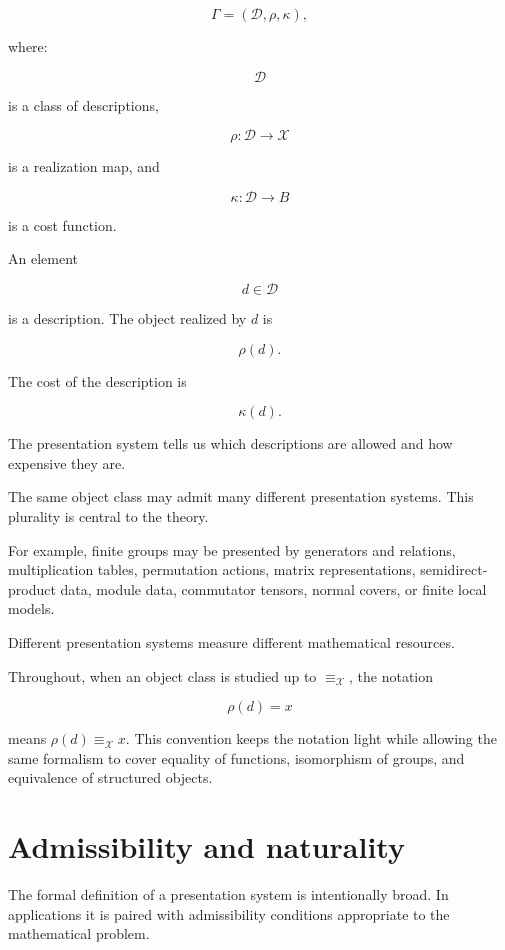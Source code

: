 \documentclass[11pt]{article}
\begin{document}
\[
\Gamma=(\mathcal D,\rho,\kappa),
\]

where:

\[
\mathcal D
\]

is a class of descriptions,

\[
\rho:\mathcal D\to \mathcal X
\]

is a realization map, and

\[
\kappa:\mathcal D\to B
\]

is a cost function.

An element

\[
d\in\mathcal D
\]

is a description. The object realized by \(d\) is

\[
\rho(d).
\]

The cost of the description is

\[
\kappa(d).
\]

The presentation system tells us which descriptions are allowed and how expensive they are.

The same object class may admit many different presentation systems. This plurality is central to the theory.

For example, finite groups may be presented by generators and relations, multiplication tables, permutation actions, matrix representations, semidirect-product data, module data, commutator tensors, normal covers, or finite local models.

Different presentation systems measure different mathematical resources.

Throughout, when an object class is studied up to \(\equiv_\mathcal X\), the notation

\[
\rho(d)=x
\]

means \(\rho(d)\equiv_\mathcal X x\). This convention keeps the notation light while allowing the same formalism to cover equality of functions, isomorphism of groups, and equivalence of structured objects.


\section{Admissibility and naturality}

The formal definition of a presentation system is intentionally broad. In applications it is paired with admissibility conditions appropriate to the mathematical problem.
\end{document}
